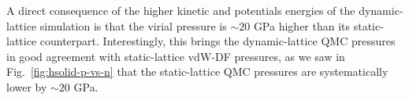 A direct consequence of the higher kinetic and potentials energies of the dynamic-lattice simulation is that the virial pressure is $\sim 20$ GPa higher than its static-lattice counterpart.
Interestingly, this brings the dynamic-lattice QMC pressures in good agreement with static-lattice vdW-DF pressures, as we saw in Fig.~\ref{fig:hsolid-p-vs-n} that the static-lattice QMC pressures are systematically lower by $\sim 20$ GPa.



